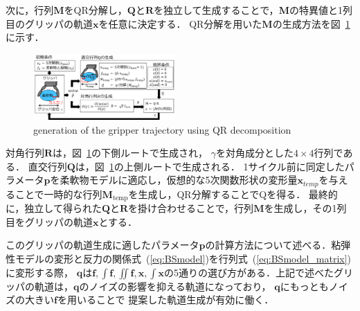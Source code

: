 \documentclass[a4paper]{jarticle}
\begin{document}
次に，行列$\mathbf{M}$をQR分解し，$\mathbf{Q}$と$\mathbf{R}$を独立して生成することで，$\mathbf{M}$の特異値と1列目のグリッパの軌道$\boldsymbol{x}$を任意に決定する．
QR分解を用いた$\mathbf{M}$の生成方法を図~\ref{fig:QR_traj}に示す．
\begin{figure}[htbp]
    \centering
    \includegraphics[width=0.48\textwidth]{QR_traj.pdf}
    \captionsetup{width=0.9\linewidth} %
    \caption{generation of the gripper trajectory using QR decomposition}
    \label{fig:QR_traj}
\end{figure}
対角行列$\mathbf{R}$は，図~\ref{fig:QR_traj}の下側ルートで生成され，
$\gamma$を対角成分とした$4\times4$行列である．
直交行列$\mathbf{Q}$は，図~\ref{fig:QR_traj}の上側ルートで生成される．
1サイクル前に同定したパラメータ$\mathbf{p}$を柔軟物モデルに適応し，仮想的な5次関数形状の変形量$\boldsymbol{x}_{temp}$を与えることで一時的な行列$\mathbf{M}_{\mathrm{temp}}$を生成し，QR分解することでQを得る．
最終的に，独立して得られた$\mathbf{Q}$と$\mathbf{R}$を掛け合わせることで，行列$\mathbf{M}$を生成し，その1列目をグリッパの軌道$\boldsymbol{x}$とする．

このグリッパの軌道生成に適したパラメータ$\mathbf{p}$の計算方法について述べる．粘弾性モデルの変形と反力の関係式~(\ref{eq:BSmodel})を行列式~(\ref{eq:BSmodel_matrix})に変形する際，
$\mathbf{q}$は$\boldsymbol{f}, \int{\boldsymbol{f}} , \iint{\boldsymbol{f}}, \boldsymbol{x} , \int{\boldsymbol{x}}$の5通りの選び方がある．上記で述べたグリッパの軌道は，$\mathbf{q}$のノイズの影響を抑える軌道になっており，
$\mathbf{q}$にもっともノイズの大きい$\boldsymbol{f}$を用いることで
提案した軌道生成が有効に働く．

\end{document}
